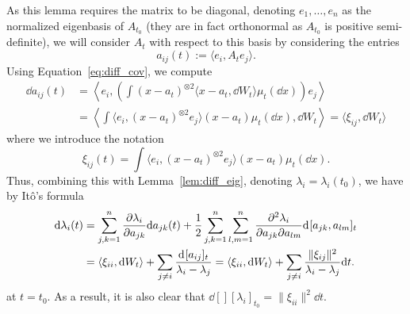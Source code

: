 As this lemma requires the matrix to be diagonal, denoting \(e_1, \ldots, e_n\) as the normalized 
eigenbasis of \(A_{t_0}\) (they are in fact orthonormal as \(A_{t_0}\) is positive semi-definite), 
we will consider \(A_t\) with respect to this basis by considering the entries 
\[a_{ij}(t) := \langle e_i, A_t e_j\rangle.\]
Using Equation~\eqref{eq:diff_cov}, we compute 
\begin{align*}
  \dd a_{ij}(t) & = \left\langle e_i, \left(\int (x - a_t)^{\otimes 2} 
    \langle x - a_t, \dd W_t \rangle \mu_t(\dd x)\right) e_j \right\rangle\\
    & = \left\langle\int \langle e_i, (x - a_t)^{\otimes 2} e_j\rangle
      (x - a_t) \mu_t(\dd x), \dd W_t\right\rangle
      = \langle \xi_{ij}, \dd W_t\rangle
\end{align*}
where we introduce the notation 
\[\xi_{ij}(t) = \int \langle e_i, (x - a_t)^{\otimes 2} e_j\rangle (x - a_t) \mu_t(\dd x).\]
Thus, combining this with Lemma~\ref{lem:diff_eig}, 
denoting \(\lambda_i = \lambda_i(t_0)\), we have by Itô's formula
\begin{equation}
  \begin{split}
    \dd \lambda_i(t) 
    & = \sum_{j, k = 1}^n \pdv{\lambda_i}{a_{jk}} \dd a_{jk}(t) 
      + \frac{1}{2}\sum_{j, k = 1}^n \sum_{l, m = 1}^n \pdv[2]{\lambda_i}{a_{jk}}{a_{lm}} \dd[] [a_{jk}, a_{lm}]_t\\
    & = \langle \xi_{ii}, \dd W_t\rangle + \sum_{j \neq i} \frac{\dd[][a_{ij}]_t}{\lambda_i - \lambda_j}
      = \langle \xi_{ii}, \dd W_t\rangle + \sum_{j \neq i} \frac{\|\xi_{ij}\|^2}{\lambda_i - \lambda_{j}} \dd t.
  \end{split}
\end{equation}
at \(t = t_0\). As a result, it is also clear that \(\dd[][\lambda_i]_{t_0} = \|\xi_{ii}\|^2 \dd t\). 

